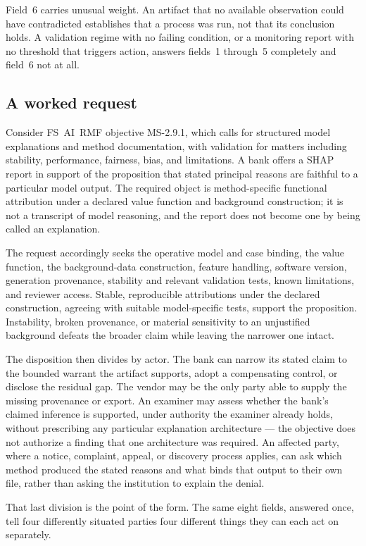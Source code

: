 Field~6 carries unusual weight. An artifact that no available observation could
have contradicted establishes that a process was run, not that its conclusion
holds. A validation regime with no failing condition, or a monitoring report
with no threshold that triggers action, answers fields~1 through~5 completely
and field~6 not at all.

\subsection{A worked request}
\label{sec:request:worked}

Consider FS~AI~RMF objective MS-2.9.1, which calls for structured model
explanations and method documentation, with validation for matters including
stability, performance, fairness, bias, and limitations. A bank offers a SHAP
report in support of the proposition that stated principal reasons are faithful
to a particular model output. The required object is method-specific functional
attribution under a declared value function and background construction; it is
not a transcript of model reasoning, and the report does not become one by
being called an explanation.

The request accordingly seeks the operative model and case binding, the value
function, the background-data construction, feature handling, software version,
generation provenance, stability and relevant validation tests, known
limitations, and reviewer access. Stable, reproducible attributions under the
declared construction, agreeing with suitable model-specific tests, support the
proposition. Instability, broken provenance, or material sensitivity to an
unjustified background defeats the broader claim while leaving the narrower one
intact.

The disposition then divides by actor. The bank can narrow its stated claim to
the bounded warrant the artifact supports, adopt a compensating control, or
disclose the residual gap. The vendor may be the only party able to supply the
missing provenance or export. An examiner may assess whether the bank's claimed
inference is supported, under authority the examiner already holds, without
prescribing any particular explanation architecture --- the objective does not
authorize a finding that one architecture was required. An affected party, where
a notice, complaint, appeal, or discovery process applies, can ask which method
produced the stated reasons and what binds that output to their own file, rather
than asking the institution to explain the denial.

That last division is the point of the form. The same eight fields, answered
once, tell four differently situated parties four different things they can each
act on separately.
